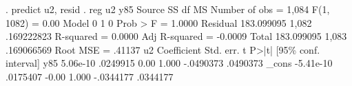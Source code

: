 . predict u2, resid
{\smallskip}
. reg u2 y85
{\smallskip}
      Source {\VBAR}       SS           df       MS      Number of obs   =     1,084
   F(1, 1082)      =      0.00
       Model {\VBAR}           0         1           0   Prob > F        =    1.0000
    Residual {\VBAR}  183.099095     1,082  .169222823   R-squared       =    0.0000
   Adj R-squared   =   -0.0009
       Total {\VBAR}  183.099095     1,083  .169066569   Root MSE        =    .41137
{\smallskip}
          u2 {\VBAR} Coefficient  Std. err.      t    P>|t|     [95\% conf. interval]
         y85 {\VBAR}   5.06e-10   .0249915     0.00   1.000    -.0490373    .0490373
       _cons {\VBAR}  -5.41e-10   .0175407    -0.00   1.000    -.0344177    .0344177
{\smallskip}
